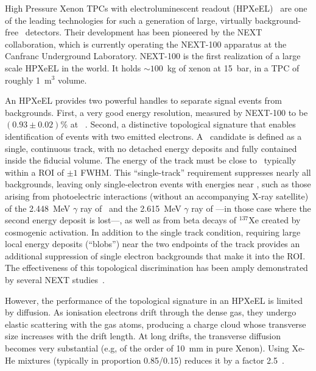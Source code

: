 \documentclass[11pt,a4paper]{article}
\begin{document}
High Pressure Xenon TPCs with electroluminescent readout (HPXeEL)~\cite{Gomez-Cadenas:2019ges} are one of the leading technologies for such a generation of large, virtually background-free \bbonu\ detectors. Their development has been pioneered by the NEXT collaboration, which is currently operating the NEXT-100 apparatus \cite{NEXT:2025yqw} at the Canfranc Underground Laboratory. NEXT-100 is the first realization of a large scale HPXeEL in the world. It holds $\sim100$~kg of xenon at 15~bar, in a TPC of roughly 1~m$^3$ volume.  

An HPXeEL provides two powerful handles to separate signal events from backgrounds. First, a very good energy resolution, measured by NEXT-100 to be $(0.93 \pm 0.02)$\% at \Qbb~\cite{NEXT:2025ozn}. Second, a distinctive topological signature that enables identification of events with two emitted electrons. A \bbonu\ candidate is defined as a single, continuous track, with no detached energy deposits and fully contained inside the fiducial volume. The energy of the track must be close to \Qbb\, typically within a ROI of $\pm 1$ FWHM.  This ``single-track'' requirement suppresses nearly all backgrounds, leaving only single-electron events with energies near \Qbb, such as those arising from photoelectric interactions (without an accompanying X-ray satellite) of the 2.448~MeV $\gamma$ ray of \BI\ and the 2.615~MeV $\gamma$ ray of \TL ---in those case where the second energy deposit is lost---, as well as from beta decays of $^{137}$Xe created by cosmogenic activation. In addition to the single track condition, requiring large local energy deposits (``blobs'') near the two endpoints of the track provides an additional suppression of single electron backgrounds that make it into the ROI. The effectiveness of this topological discrimination has been amply demonstrated by several NEXT studies~\cite{Ferrario:2015kta, Ferrario:2019kwg, NEXT:2021vzd, Kekic2021, NEXT:2021pjq}. 

However, the performance of the topological signature in an HPXeEL is limited by diffusion. As ionisation electrons drift through the dense gas, they undergo elastic scattering with the gas atoms, producing a charge cloud whose transverse size increases with the drift length. At long drifts, the transverse diffusion becomes very substantial (e.g, of the order of \SI{10}{mm} in pure Xenon). Using Xe-He mixtures (typically in proportion 0.85/0.15)  reduces it by a factor 2.5~\cite{Felkai:2017oeq, McDonald_2019, NEXT:2019oxh}.  
\end{document}
